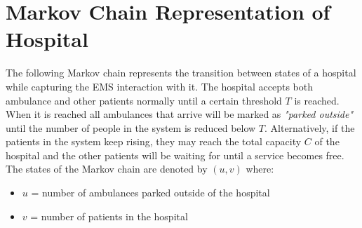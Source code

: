 \documentclass{article}
\begin{document}
\section{Markov Chain Representation of Hospital}
The following Markov chain represents the transition between states of a hospital while capturing the EMS interaction with it. The hospital accepts both ambulance and other patients normally until a certain threshold \(T\) is reached. When it is reached all ambulances that arrive will be marked as \textit{"parked outside"} until the number of people in the system is reduced below \(T\). Alternatively, if the patients in the system keep rising, they may reach the total capacity \(C\) of the hospital and the other patients will be waiting for until a service becomes free. The states of the Markov chain are denoted by \((u,v)\) where:
\begin{itemize}
    \item \(u\) = number of ambulances parked outside of the hospital
    \item \(v\) = number of patients in the hospital
\end{itemize}
\end{document}
